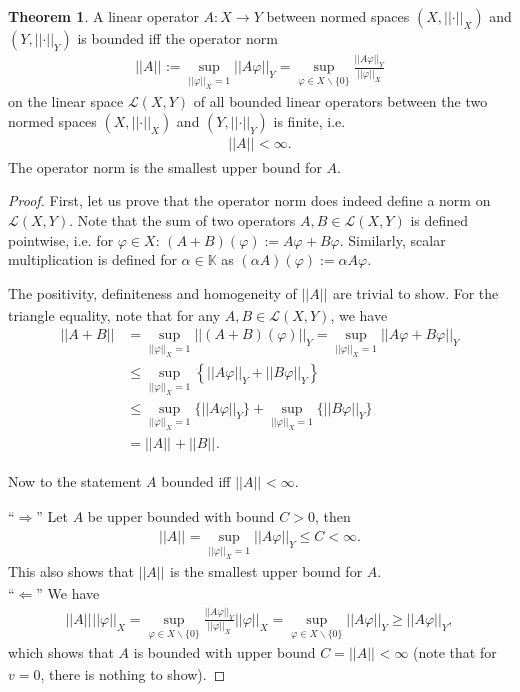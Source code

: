 \documentclass[12pt, a4paper]{article}
\numberwithin{equation}{section}
\theoremstyle{definition}
\theoremstyle{definition}
\newtheorem{theorem}[thm]{Theorem}
\newcommand{\norm}[2]{\left\vert\left\vert #1 \right\vert\right\vert_{#2}}
\begin{document}
	\begin{theorem}
		A linear operator $A: X\to Y$ between normed spaces $(X, \norm{\cdot}{X})$ and $(Y, \norm{\cdot}{Y})$ is bounded iff the operator norm
		\begin{align}
			\norm{A}{} := \sup_{\norm{\varphi}{X} = 1}\norm{A\varphi}{Y} = \sup_{\varphi\in X\backslash \{0\}}\frac{\norm{A\varphi}{Y}}{\norm{\varphi}{X}}
		\end{align}
		on the linear space $\mathcal L(X, Y)$ of all bounded linear operators between the two normed spaces $(X, \norm{\cdot}{X})$ and $(Y, \norm{\cdot}{Y})$ is finite, i.e. 
		\begin{align}
			\norm{A}{} < \infty. 
		\end{align} 
		The operator norm is the smallest upper bound for $A$.
	\end{theorem}
	
	\begin{proof}
		First, let us prove that the operator norm does indeed define a norm on $\mathcal L(X, Y)$. Note that the sum of two operators $A, B\in\mathcal L(X, Y)$ is defined pointwise, i.e. for $\varphi\in X$: $\left(A + B\right)(\varphi) := A\varphi + B\varphi$. Similarly, scalar multiplication is defined for $\alpha \in \mathbb K$ as $\left(\alpha A\right)(\varphi) := \alpha A\varphi$.
		
		The positivity, definiteness and homogeneity of $\norm{A}{}$ are trivial to show. For the triangle equality, note that for any $A, B\in\mathcal L(X, Y)$, we have
		\begin{align}
			\norm{A + B}{} &= \sup_{\norm{\varphi}{X} = 1}\norm{\left(A + B\right)(\varphi)}{Y} = \sup_{\norm{\varphi}{X} = 1}\norm{A\varphi + B\varphi}{Y}
			\\ &\leq \sup_{\norm{\varphi}{X} = 1} \left\{\norm{A\varphi}{Y} + \norm{B\varphi}{Y}\right\} 
			\\ &\leq \sup_{\norm{\varphi}{X} = 1}\{ \norm{A\varphi}{Y} \} + \sup_{\norm{\varphi}{X} = 1}\{ \norm{B\varphi}{Y} \} 
			\\ &= \norm{A}{} + \norm{B}{}.
		\end{align}
	
		Now to the statement $A$ bounded iff $\norm{A}{} < \infty$.
		
		\enquote{$\Longrightarrow$} Let $A$ be upper bounded with bound $C > 0$, then
		\begin{align}
			\norm{A}{} = \sup_{\norm{\varphi}{X} = 1}\norm{A\varphi}{Y} \leq C < \infty.
		\end{align}
		This also shows that $\norm{A}{}$ is the smallest upper bound for $A$.
		\\
		
		\enquote{$\Longleftarrow$} We have 
		\begin{align}
			\norm{A}{} \norm{\varphi}{X} = \sup_{\varphi\in X\backslash \{0\}}\frac{\norm{A\varphi}{Y}}{\norm{\varphi}{X}} \norm{\varphi}{X} = \sup_{\varphi\in X\backslash \{0\}}\norm{A\varphi}{Y} \geq \norm{A\varphi}{Y},
		\end{align}
		which shows that $A$ is bounded with upper bound $C = \norm{A}{} < \infty$ (note that for $v = 0$, there is nothing to show).
	\end{proof}
\end{document}
